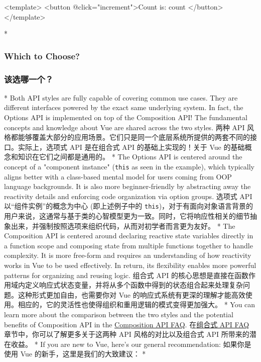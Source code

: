 \begin{paracol}{2}
\begin{codeVue}
    <template>
      <button @click="increment">Count is: {{ count }}</button>
    </template>
\end{codeVue}    
\switchcolumn[0]*%
\subsubsection{Which to Choose?}
\switchcolumn
\subsubsection{该选哪一个？}
\switchcolumn[0]*%
Both API styles are fully capable of covering common use cases. They are
different interfaces powered by the exact same underlying system. In
fact, the Options API is implemented on top of the Composition API! The
fundamental concepts and knowledge about Vue are shared across the two
styles.
\switchcolumn
两种 API
风格都能够覆盖大部分的应用场景。它们只是同一个底层系统所提供的两套不同的接口。实际上，选项式
API 是在组合式 API 的基础上实现的！关于 Vue
的基础概念和知识在它们之间都是通用的。
\switchcolumn[0]*%
The Options API is centered around the concept of a "component instance"
(\texttt{this} as seen in the example), which typically aligns better
with a class-based mental model for users coming from OOP language
backgrounds. It is also more beginner-friendly by abstracting away the
reactivity details and enforcing code organization via option groups.
\switchcolumn
选项式 API 以``组件实例''的概念为中心 (即上述例子中的
\texttt{this})，对于有面向对象语言背景的用户来说，这通常与基于类的心智模型更为一致。同时，它将响应性相关的细节抽象出来，并强制按照选项来组织代码，从而对初学者而言更为友好。
\switchcolumn[0]*%
The Composition API is centered around declaring reactive state
variables directly in a function scope and composing state from multiple
functions together to handle complexity. It is more free-form and
requires an understanding of how reactivity works in Vue to be used
effectively. In return, its flexibility enables more powerful patterns
for organizing and reusing logic.
\switchcolumn
组合式 API
的核心思想是直接在函数作用域内定义响应式状态变量，并将从多个函数中得到的状态组合起来处理复杂问题。这种形式更加自由，也需要你对
Vue
的响应式系统有更深的理解才能高效使用。相应的，它的灵活性也使得组织和重用逻辑的模式变得更加强大。
\switchcolumn[0]*%
You can learn more about the comparison between the two styles and the
potential benefits of Composition API in the
\href{https://vuejs.org/guide/extras/composition-api-faq}{Composition
API FAQ}.
\switchcolumn
在\href{https://cn.vuejs.org/guide/extras/composition-api-faq.html}{组合式
API FAQ} 章节中，你可以了解更多关于这两种 API 风格的对比以及组合式 API
所带来的潜在收益。
\switchcolumn[0]*%
If you are new to Vue, here's our general recommendation:
\switchcolumn
如果你是使用 Vue 的新手，这里是我们的大致建议：
\switchcolumn[0]*%


\end{paracol}
